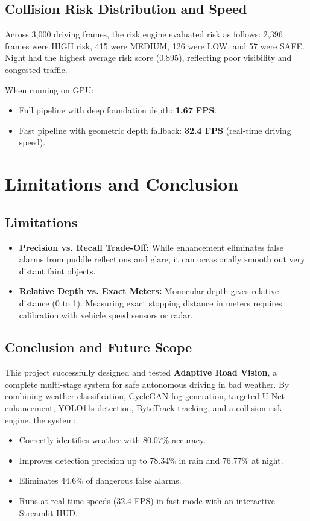 \documentclass{article}
\begin{document}
\subsection{Collision Risk Distribution and Speed}
Across 3,000 driving frames, the risk engine evaluated risk as follows: 2,396 frames were HIGH risk, 415 were MEDIUM, 126 were LOW, and 57 were SAFE. Night had the highest average risk score ($0.895$), reflecting poor visibility and congested traffic.

When running on GPU:
\begin{itemize}
    \item Full pipeline with deep foundation depth: \textbf{1.67 FPS}.
    \item Fast pipeline with geometric depth fallback: \textbf{32.4 FPS} (real-time driving speed).
\end{itemize}

\newpage
\section{Limitations and Conclusion}
\label{sec:conclusion}

\subsection{Limitations}
\begin{itemize}
    \item \textbf{Precision vs. Recall Trade-Off:} While enhancement eliminates false alarms from puddle reflections and glare, it can occasionally smooth out very distant faint objects.
    \item \textbf{Relative Depth vs. Exact Meters:} Monocular depth gives relative distance (0 to 1). Measuring exact stopping distance in meters requires calibration with vehicle speed sensors or radar.
\end{itemize}

\subsection{Conclusion and Future Scope}
This project successfully designed and tested \textbf{Adaptive Road Vision}, a complete multi-stage system for safe autonomous driving in bad weather. By combining weather classification, CycleGAN fog generation, targeted U-Net enhancement, YOLO11s detection, ByteTrack tracking, and a collision risk engine, the system:
\begin{itemize}
    \item Correctly identifies weather with 80.07\% accuracy.
    \item Improves detection precision up to 78.34\% in rain and 76.77\% at night.
    \item Eliminates 44.6\% of dangerous false alarms.
    \item Runs at real-time speeds (32.4 FPS) in fast mode with an interactive Streamlit HUD.
\end{itemize}
\end{document}
